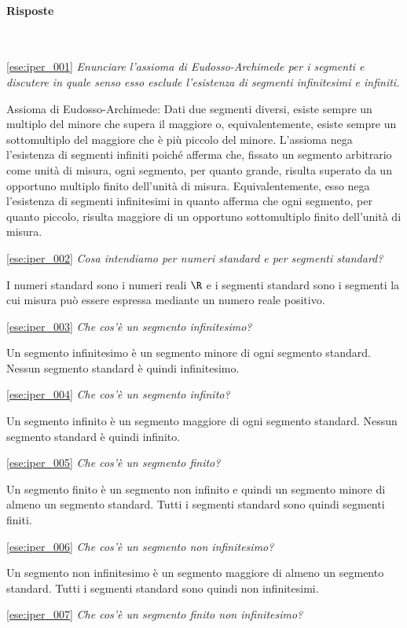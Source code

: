 \paragraph{Risposte}
~

\ref{ese:iper_001} 
\emph{Enunciare l'assioma di Eudosso-Archimede per i segmenti e 
discutere in quale senso esso esclude l'esistenza di segmenti infinitesimi e 
infiniti.}

Assioma di Eudosso-Archimede: Dati due segmenti diversi, esiste sempre un 
multiplo del minore che supera il maggiore o, equivalentemente, esiste sempre 
un sottomultiplo del maggiore che è più piccolo del minore.
L'assioma nega l'esistenza di segmenti infiniti poiché afferma che, fissato 
un 
segmento arbitrario come unità di misura, ogni segmento, per quanto grande, 
risulta superato da un opportuno multiplo finito dell'unità di misura. 
Equivalentemente, esso nega l'esistenza di segmenti infinitesimi in quanto 
afferma che ogni segmento, per quanto piccolo, risulta maggiore di un 
opportuno 
sottomultiplo finito dell'unità di misura.

\ref{ese:iper_002} 
\noindent\emph{Cosa intendiamo per numeri standard e per segmenti standard?}

I numeri standard sono i numeri reali \(\R\) e i segmenti standard sono i 
segmenti la cui misura può essere espressa mediante un numero reale positivo.

\ref{ese:iper_003} 
\emph{Che cos'è un segmento infinitesimo?}

Un segmento infinitesimo è un segmento minore di ogni segmento standard. 
Nessun segmento standard è quindi infinitesimo.

\ref{ese:iper_004} 
\emph{Che cos'è un segmento infinito?}

Un segmento infinito è un segmento maggiore di ogni segmento standard. 
Nessun segmento standard è quindi infinito.

\ref{ese:iper_005} 
\emph{Che cos'è un segmento finito?}

Un segmento finito è un segmento non infinito e quindi un segmento minore di 
almeno un segmento standard. 
Tutti i segmenti standard sono quindi segmenti finiti.

\ref{ese:iper_006} 
\emph{Che cos'è un segmento non infinitesimo?}

Un segmento non infinitesimo è un segmento maggiore di almeno un segmento 
standard. Tutti i segmenti standard sono quindi non infinitesimi.

\ref{ese:iper_007} 
\emph{Che cos'è un segmento finito non infinitesimo?}

